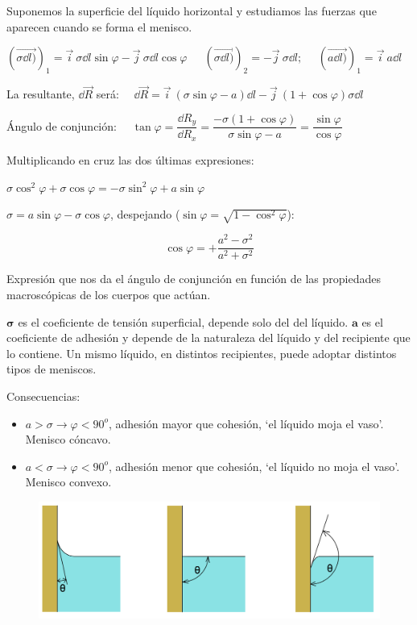 Suponemos la superficie del líquido horizontal y estudiamos las fuerzas que aparecen cuando se forma el menisco.

$(\overrightarrow{\sigma \dd l)})_1=\vec i\ \sigma \dd l \sin \varphi - \vec j \ \sigma \dd l \cos \varphi\, \quad$
$(\overrightarrow{\sigma \dd l)})_2=  - \vec j \ \sigma \dd l;$
$\quad (\overrightarrow{a \dd l)})_1=\vec i\ a \dd l$

La resultante, $\dd \vec R$ será: 
$\quad \dd \vec R=\vec i\ (\sigma \sin \varphi - a)\dd l -\vec j \ (1+\cos \varphi) \sigma \dd l$

Ángulo de conjunción: $\quad \tan \varphi=\dfrac {\dd R_y}{\dd R_x}=\dfrac{-\sigma(1+\cos \varphi)}{\sigma \sin \varphi - a}=\dfrac{\sin \varphi}{\cos \varphi}$

Multiplicando en cruz las dos últimas expresiones:

$\sigma \cos^2 \varphi+\sigma \cos \varphi=-\sigma \sin^2 \varphi + a \sin \varphi$

$\sigma=a\sin \varphi - \sigma \cos \varphi$, despejando \small{($\sin \varphi=\sqrt{1-\cos^2 \varphi}$)}\normalsize{:}

\begin{equation}
\cos \varphi=+ \dfrac{a^2-\sigma^2}{a^2+\sigma^2}	
\end{equation}

Expresión que nos da el ángulo de conjunción en función de las propiedades macroscópicas de los cuerpos que actúan.

$\boldsymbol{\sigma}$ es el coeficiente de tensión superficial, depende solo del del líquido. $\boldsymbol{a}$ es el coeficiente de adhesión y depende de la naturaleza del líquido y del recipiente que lo contiene. Un mismo líquido, en distintos recipientes, puede adoptar distintos tipos de meniscos.

Consecuencias:

\vspace{-2mm} \begin{itemize}
\vspace{-2mm} \item $a>\sigma \to \varphi<90^o$, adhesión mayor que cohesión, `el líquido moja el vaso'.	 \textsf{Menisco cóncavo}.
\vspace{-2mm} \item $a<\sigma \to \varphi<90^o$, adhesión menor que cohesión, `el líquido no moja el vaso'. \textsf{Menisco convexo}.	
\end{itemize}

\begin{figure}[H]
	\centering
	\includegraphics[width=.9\textwidth]{imagenes/imagenes08/T08IM13.png}
\end{figure}

